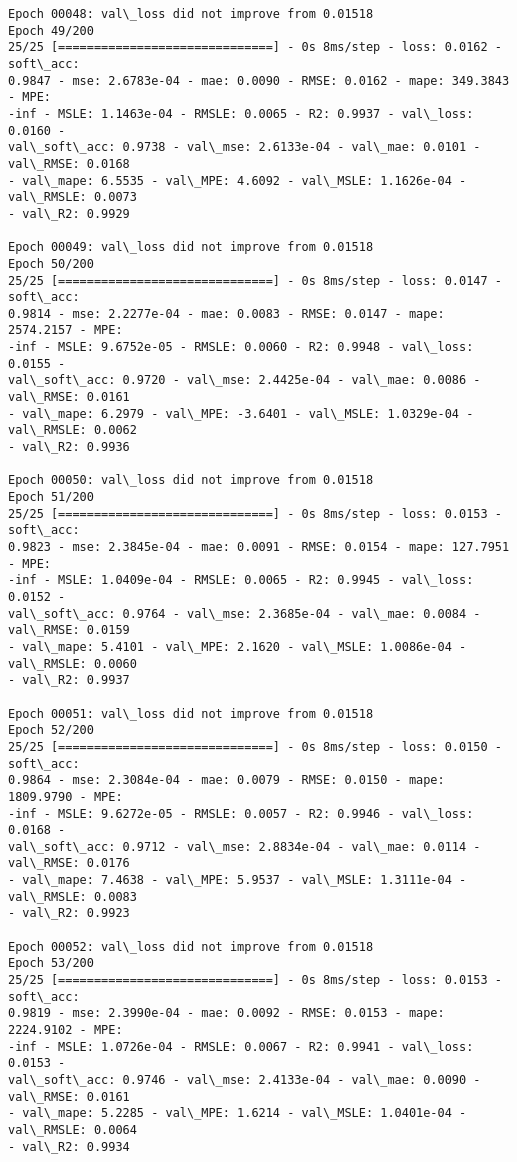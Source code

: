 \documentclass[11pt]{article}
\begin{document}
\begin{Verbatim}[commandchars=\\\{\}]
Epoch 00048: val\_loss did not improve from 0.01518
Epoch 49/200
25/25 [==============================] - 0s 8ms/step - loss: 0.0162 - soft\_acc:
0.9847 - mse: 2.6783e-04 - mae: 0.0090 - RMSE: 0.0162 - mape: 349.3843 - MPE:
-inf - MSLE: 1.1463e-04 - RMSLE: 0.0065 - R2: 0.9937 - val\_loss: 0.0160 -
val\_soft\_acc: 0.9738 - val\_mse: 2.6133e-04 - val\_mae: 0.0101 - val\_RMSE: 0.0168
- val\_mape: 6.5535 - val\_MPE: 4.6092 - val\_MSLE: 1.1626e-04 - val\_RMSLE: 0.0073
- val\_R2: 0.9929

Epoch 00049: val\_loss did not improve from 0.01518
Epoch 50/200
25/25 [==============================] - 0s 8ms/step - loss: 0.0147 - soft\_acc:
0.9814 - mse: 2.2277e-04 - mae: 0.0083 - RMSE: 0.0147 - mape: 2574.2157 - MPE:
-inf - MSLE: 9.6752e-05 - RMSLE: 0.0060 - R2: 0.9948 - val\_loss: 0.0155 -
val\_soft\_acc: 0.9720 - val\_mse: 2.4425e-04 - val\_mae: 0.0086 - val\_RMSE: 0.0161
- val\_mape: 6.2979 - val\_MPE: -3.6401 - val\_MSLE: 1.0329e-04 - val\_RMSLE: 0.0062
- val\_R2: 0.9936

Epoch 00050: val\_loss did not improve from 0.01518
Epoch 51/200
25/25 [==============================] - 0s 8ms/step - loss: 0.0153 - soft\_acc:
0.9823 - mse: 2.3845e-04 - mae: 0.0091 - RMSE: 0.0154 - mape: 127.7951 - MPE:
-inf - MSLE: 1.0409e-04 - RMSLE: 0.0065 - R2: 0.9945 - val\_loss: 0.0152 -
val\_soft\_acc: 0.9764 - val\_mse: 2.3685e-04 - val\_mae: 0.0084 - val\_RMSE: 0.0159
- val\_mape: 5.4101 - val\_MPE: 2.1620 - val\_MSLE: 1.0086e-04 - val\_RMSLE: 0.0060
- val\_R2: 0.9937

Epoch 00051: val\_loss did not improve from 0.01518
Epoch 52/200
25/25 [==============================] - 0s 8ms/step - loss: 0.0150 - soft\_acc:
0.9864 - mse: 2.3084e-04 - mae: 0.0079 - RMSE: 0.0150 - mape: 1809.9790 - MPE:
-inf - MSLE: 9.6272e-05 - RMSLE: 0.0057 - R2: 0.9946 - val\_loss: 0.0168 -
val\_soft\_acc: 0.9712 - val\_mse: 2.8834e-04 - val\_mae: 0.0114 - val\_RMSE: 0.0176
- val\_mape: 7.4638 - val\_MPE: 5.9537 - val\_MSLE: 1.3111e-04 - val\_RMSLE: 0.0083
- val\_R2: 0.9923

Epoch 00052: val\_loss did not improve from 0.01518
Epoch 53/200
25/25 [==============================] - 0s 8ms/step - loss: 0.0153 - soft\_acc:
0.9819 - mse: 2.3990e-04 - mae: 0.0092 - RMSE: 0.0153 - mape: 2224.9102 - MPE:
-inf - MSLE: 1.0726e-04 - RMSLE: 0.0067 - R2: 0.9941 - val\_loss: 0.0153 -
val\_soft\_acc: 0.9746 - val\_mse: 2.4133e-04 - val\_mae: 0.0090 - val\_RMSE: 0.0161
- val\_mape: 5.2285 - val\_MPE: 1.6214 - val\_MSLE: 1.0401e-04 - val\_RMSLE: 0.0064
- val\_R2: 0.9934


\end{Verbatim}
\end{document}

